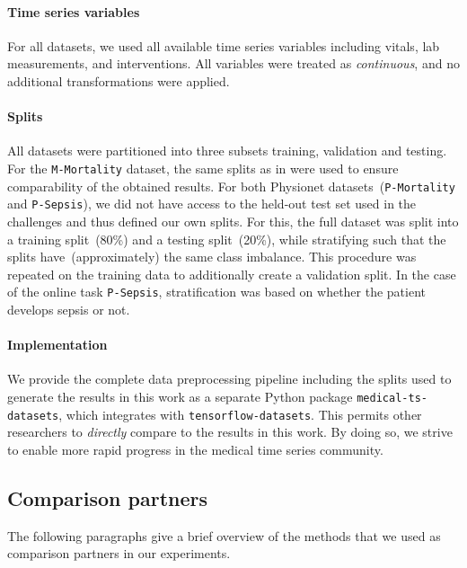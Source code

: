 \documentclass{article}
\newcommand{\dataset}[1]{\texttt{#1}}
\begin{document}
\paragraph{Time series variables}

For all datasets, we used all available time series variables including vitals,
lab measurements, and interventions. All variables were treated as
\emph{continuous}, and no additional transformations were applied.

\paragraph{Splits}

All datasets were partitioned into three subsets training, validation and
testing. For the \dataset{M-Mortality} dataset, the same splits as in
\cite{Harutyunyan2019} were used to ensure comparability of the obtained
results.  For both Physionet datasets~(\dataset{P-Mortality} and
\dataset{P-Sepsis}), we did not have access to the held-out test set used in
the challenges and thus defined our own splits. For this, the full dataset was
split into a training split~(80\%) and a testing split~(20\%), while
stratifying such that the splits have~(approximately) the same class imbalance.
This procedure was repeated on the training data to additionally create
a validation split. In the case of the online task \dataset{P-Sepsis},
stratification was based on whether the patient develops sepsis or not.

\paragraph{Implementation} We provide the complete data preprocessing
pipeline including the splits used to generate the results in this work
as a separate Python package \texttt{medical-ts-datasets}, which
integrates with \texttt{tensorflow-datasets}\citep{TFDS}.  This permits other
researchers to \emph{directly} compare to the results in this work. By
doing so, we strive to enable more rapid progress in the medical time
series community.

\subsection{Comparison partners}

The following paragraphs give a brief overview of the methods that we
used as comparison partners in our experiments.
\end{document}
